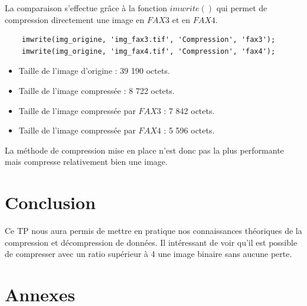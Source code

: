 \documentclass[11pt]{article}
\begin{document}
  La comparaison s'effectue grâce à la fonction $imwrite()$ qui permet de compression directement une image en $FAX3$ et en $FAX4$.
  
  \begin{lstlisting}
  	imwrite(img_origine, 'img_fax3.tif', 'Compression', 'fax3');
  	imwrite(img_origine, 'img_fax4.tif', 'Compression', 'fax4');
  \end{lstlisting}
  
  
  \begin{itemize}
  	\item Taille de l'image d'origine : 39 190 octets.
  	\item Taille de l'image compressée : 8 722 octets.
  	\item Taille de l'image compressée par $FAX3$ : 7 842 octets.
  	\item Taille de l'image compressée par $FAX4$ : 5 596 octets.
  \end{itemize}
  
  La méthode de compression mise en place n'est donc pas la plus performante mais compresse relativement bien une image.

\newpage
\section{Conclusion}

  Ce TP nous aura permis de mettre en pratique nos connaissances théoriques de la compression et décompression de données. Il intéressant de voir qu'il est possible de compresser avec un ratio supérieur à 4 une image binaire sans aucune perte.

\section{Annexes}
\end{document}
